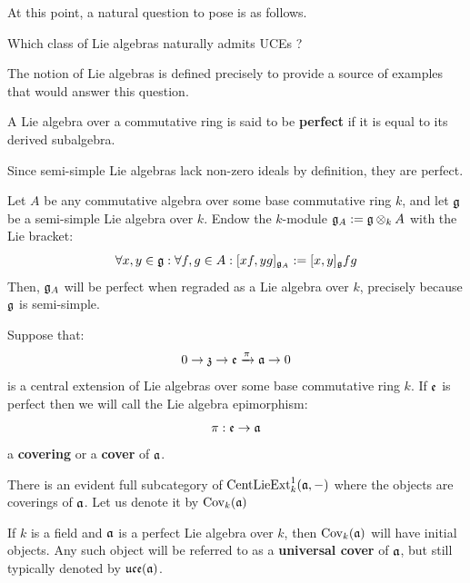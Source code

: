         At this point, a natural question to pose is as follows.
        \begin{question}
            Which class of Lie algebras naturally admits UCEs ? 
        \end{question}
        The notion of  Lie algebras is defined precisely to provide a source of examples that would answer this question.
        \begin{definition}
            A Lie algebra over a commutative ring is said to be \textbf{perfect} if it is equal to its derived subalgebra. 
        \end{definition}
        \begin{example}
            Since semi-simple Lie algebras lack non-zero ideals by definition, they are perfect. 
        \end{example}
        \begin{example}
            Let $A$ be any commutative algebra over some base commutative ring $k$, and let $\mathfrak{g}$ be a semi-simple Lie algebra over $k$. Endow the $k$-module $\g_A := \g \tensor_k A$ with the Lie bracket:
                $$\forall x, y \in \mathfrak{g}: \forall f, g \in A: [x f, y g]_{\mathfrak{g}_A} := [x, y]_{\mathfrak{g}} fg$$
            Then, $\mathfrak{g}_A$ will be perfect when regraded as a Lie algebra over $k$, precisely because $\mathfrak{g}$ is semi-simple.
        \end{example}
        \begin{definition}
            Suppose that:
                $$0 \to \mathfrak{z} \to \mathfrak{e} \xrightarrow[]{\pi} \mathfrak{a} \to 0$$
            is a central extension of Lie algebras over some base commutative ring $k$. If $\mathfrak{e}$ is perfect then we will call the Lie algebra epimorphism:
                $$\pi: \mathfrak{e} \to \mathfrak{a}$$
            a \textbf{covering} or a \textbf{cover} of $\mathfrak{a}$. 

            There is an evident full subcategory of $\mathrm{Cent}\mathrm{Lie}\mathrm{Ext}^1_k(\mathfrak{a}, -)$ where the objects are coverings of $\mathfrak{a}$. Let us denote it by $\mathrm{Cov}_k(\mathfrak{a})$
        \end{definition}
        \begin{proposition} \label{prop: perfect_lie_algebras_admit_UCEs}
            \cite[Lemma 1.10]{garland_arithmetics_of_loop_groups} If $k$ is a field and $\mathfrak{a}$ is a perfect Lie algebra over $k$, then $\mathrm{Cov}_k(\mathfrak{a})$ will have initial objects. Any such object will be referred to as a \textbf{universal cover} of $\mathfrak{a}$, but still typically denoted by $\mathfrak{uce}(\mathfrak{a})$.
        \end{proposition}

